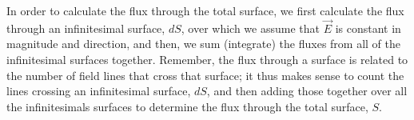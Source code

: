 In order to calculate the flux through the total surface, we first calculate the flux through an infinitesimal surface, $dS$, over which we assume that $\vec E$ is constant in magnitude and direction, and then, we sum (integrate) the fluxes from all of the infinitesimal surfaces together. Remember, the flux through a surface is related to the number of field lines that cross that surface; it thus makes sense to count the lines crossing an infinitesimal surface, $dS$, and then adding those together over all the infinitesimals surfaces to determine the flux through the total surface, $S$.
